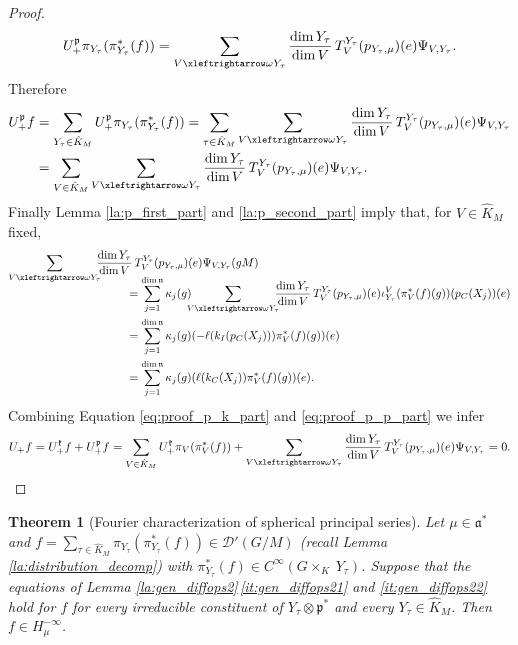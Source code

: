 \documentclass[JEP,XML,SOM,NoFloatCountersInSection,Unicode,published]{cedram}
\newtheorem{theorem}{Theorem}[section]
\theoremstyle{definition}
\newcommand{\fourier}[1]{\ensuremath{\sum_{\tau\in\hat K_M}\pi_{Y_\tau}(\pi_{Y_\tau}^*(#1))}}
\newcommand{\lraomega}{\ensuremath{\xleftrightarrow\omega}}
\newcommand{\mc}[1]{\ensuremath{\mathcal{#1}}}
\newcommand{\mf}[1]{\ensuremath{\mathfrak{#1}}}
\newcommand{\pstd}[1]{\ensuremath{H_{#1}^{-\infty}}}
\newcommand{\Ck}[1]{\ensuremath{k_C(#1)}}
\newcommand{\Cp}[1]{\ensuremath{p_C(#1)}}
\newcommand{\Ik}[1]{\ensuremath{k_I(#1)}}
\begin{document}
\begin{proof}
\[
U_+^\mf p\pi_{Y_\tau}(\pi_{Y_\tau}^*(f))=
\sum_{V\lraomega Y_\tau}\frac{\dim Y_\tau}{\dim V}\,T_V^{Y_\tau}(p_{Y_\tau,\mu})(e)\Psi_{V,Y_\tau}.
\]
Therefore
\begin{align*}
U_+^{\mf p}f&=\sum_{Y_\tau\in\hat K_M}U_+^{\mf p}\pi_{Y_\tau}(\pi_{Y_\tau}^*(f))=\sum_{\tau\in\hat K_M}\sum_{V\lraomega Y_\tau}\frac{\dim Y_\tau}{\dim V}\,T_V^{Y_\tau}(p_{Y_\tau,\mu})(e)\Psi_{V,Y_\tau}\\
&=\sum_{V\in\hat K_M}\sum_{V\lraomega Y_\tau}\frac{\dim Y_\tau}{\dim V}\,T_V^{Y_\tau}(p_{Y_\tau,\mu})(e)\Psi_{V,Y_\tau}.
\end{align*}
Finally Lemma \ref{la:p_first_part} and \ref{la:p_second_part} imply that, for $V\in\hat K_M$ fixed,
\begin{equation}\label{eq:proof_p_p_part}
\begin{split}
\sum_{V\lraomega Y_\tau}\hspace*{-2mm}\frac{\dim Y_\tau}{\dim V}&\,T_V^{Y_\tau}(p_{Y_\tau,\mu})(e)\Psi_{V,Y_\tau}(gM)\\[-10pt]
&\hspace*{-2mm}=\sum_{j=1}^{\dim\mf n}\kappa_j(g)\hspace*{-2mm}\sum_{V\lraomega Y_\tau}\hspace*{-2mm}\frac{\dim Y_\tau}{\dim V}\,T_V^{Y_\tau}(p_{Y_\tau,\mu})(e)\iota_{Y_\tau}^V(\pi_{V}^*(f)(g))(\Cp{X_j})(e)\\
&\hspace*{-2mm}=\sum_{j=1}^{\dim\mf n}\kappa_j(g)(-\ell(\Ik{\Cp{X_j}})\pi_{V}^*(f)(g))(e)\\
&\hspace*{-2mm}=\sum_{j=1}^{\dim\mf n}\kappa_j(g)(\ell(\Ck{X_j})\pi_{V}^*(f)(g))(e).
\end{split}
\end{equation}
Combining Equation \eqref{eq:proof_p_k_part} and \eqref{eq:proof_p_p_part} we infer
\[
U_+f=U_+^\mf kf+U_+^\mf pf=\sum_{V\in\hat K_M}U_+^\mf k\pi_V(\pi_{V}^*(f))+\sum_{V\lraomega Y_\tau}\frac{\dim Y_\tau}{\dim V}\,T_V^{Y_\tau}(p_{Y_\tau,\mu})(e)\Psi_{V,Y_\tau}=0.\qedhere
\]
\end{proof}

\begin{theorem}[Fourier characterization of spherical principal series]\label{thm:fourier_char}
Let $\mu\in\mf a^*$ and $f=\fourier{f}\in\mc D'(G/M)$ (recall Lemma \ref{la:distribution_decomp}) with $\pi_{Y_\tau}^*(f)\in C^\infty(G\times_K~Y_\tau)$. Suppose that the equations of Lemma \ref{la:gen_diffops2}\,\eqref{it:gen_diffops21} and \eqref{it:gen_diffops22} hold for $f$ for every irreducible constituent of $Y_\tau\otimes\mf p^*$ and every $Y_\tau\in\hat K_M$. Then $f\in\pstd{\mu}$.
\end{theorem}
\end{document}
